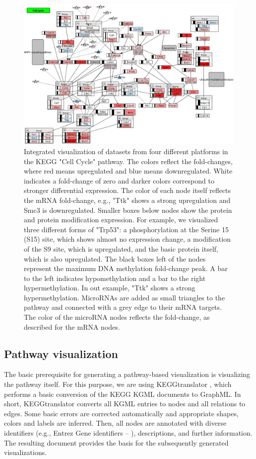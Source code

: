 \documentclass{bioinfo}
\begin{document}
\begin{figure}
\centering
\includegraphics[width=.70\textwidth]{figures/mmu04110.png}
\caption{Integrated visualization of datasets from four different platforms in the KEGG "Cell Cycle" pathway.
The colors reflect the fold-changes, where red means upregulated and blue means
downregulated. White indicates a fold-change of zero and darker colors correspond to stronger
differential expression. The color of each node itself reflects the mRNA fold-change, e.g., "Ttk"
shows a strong upregulation and Smc3 is downregulated. Smaller boxes below nodes show the protein
and protein modification expression. For example, we visualized three different forms of "Trp53": a
phosphorylation at the Serine 15 (S15) site, which shows almost no expression change, a modification
of the S9 site, which is upregulated, and the basic protein itself, which is also upregulated.  The
black boxes left of the nodes represent the maximum DNA methylation fold-change peak. A bar to the
left indicates hypomethylation and a bar to the right hypermethylation. In out example, "Ttk" shows
a strong hypermethylation. MicroRNAs are added as small triangles to the pathway and connected with
a grey edge to their mRNA targets. The color of the microRNA nodes reflects the fold-change, as
described for the mRNA nodes.}
\label{fig:cellcycle}
\end{figure}

\subsection{Pathway visualization}

The basic prerequisite for generating a pathway-based visualization is visualizing the pathway
itself. For this purpose, we are using KEGGtranslator \citep[see][]{Wrzodek2011}, which performs a
basic conversion of the KEGG KGML documents to GraphML. In short, KEGGtranslator converts all KGML entries to nodes
and all relations to edges. Some basic errors are corrected automatically and appropriate shapes,
colors and labels are inferred. Then, all nodes are annotated with diverse identifiers (e.g., Entrez Gene
identifiers -- \citealp{EntrezGene}),
descriptions, and further information. The resulting document provides the basis for the
subsequently generated visualizations.
\end{document}

